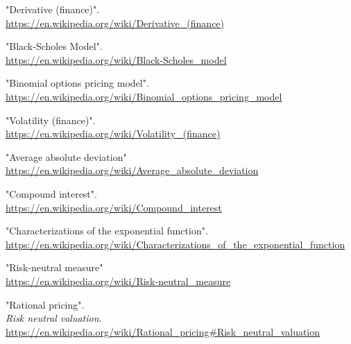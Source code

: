 \documentclass[12pt, letterpaper]{article}\usepackage{float}
\begin{document}
\pagebreak
\begin{thebibliography}{9}
    "Derivative (finance)". \\
    \href{https://en.wikipedia.org/wiki/Derivative\_(finance)}{https://en.wikipedia.org/wiki/Derivative\_(finance)}

    "Black-Scholes Model". \\
    \href{https://en.wikipedia.org/wiki/Black-Scholes\_model}{https://en.wikipedia.org/wiki/Black-Scholes\_model}

    "Binomial options pricing model". \\
    \href{https://en.wikipedia.org/wiki/Binomial\_options\_pricing\_model}{https://en.wikipedia.org/wiki/Binomial\_options\_pricing\_model}

    "Volatility (finance)". \\
    \href{https://en.wikipedia.org/wiki/Volatility\_(finance)}{https://en.wikipedia.org/wiki/Volatility\_(finance)}

    "Average absolute deviation" \\
    \href{https://en.wikipedia.org/wiki/Average\_absolute\_deviation}{https://en.wikipedia.org/wiki/Average\_absolute\_deviation}

    "Compound interest". \\
    \href{https://en.wikipedia.org/wiki/Compound\_interest}{https://en.wikipedia.org/wiki/Compound\_interest}

    "Characterizations of the exponential function". \\
    \href{https://en.wikipedia.org/wiki/Characterizations\_of\_the\_exponential\_function}{https://en.wikipedia.org/wiki/Characterizations\_of\_the\_exponential\_function}

    "Risk-neutral measure" \\
    \href{https://en.wikipedia.org/wiki/Risk-neutral\_measure}{https://en.wikipedia.org/wiki/Risk-neutral\_measure}

    "Rational pricing". \\
    \textit{Risk neutral valuation}. \\
    \href{https://en.wikipedia.org/wiki/Rational\_pricing\#Risk\_neutral\_valuation}{https://en.wikipedia.org/wiki/Rational\_pricing\#Risk\_neutral\_valuation}


\end{thebibliography}
\end{document}
